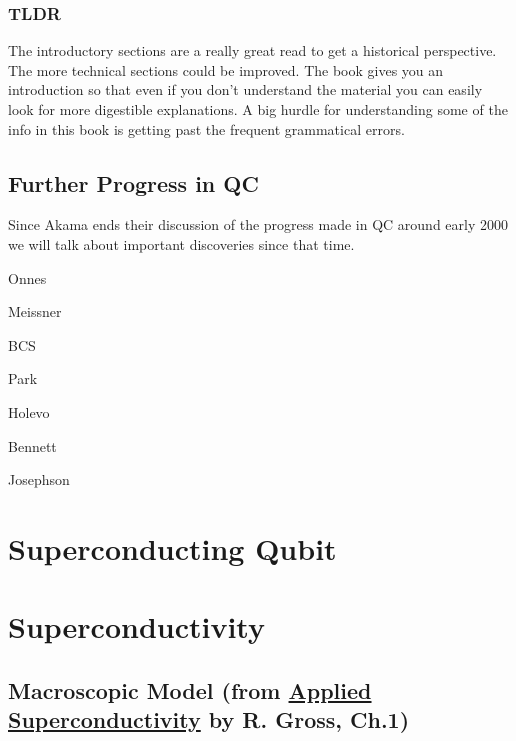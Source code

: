 \documentclass[conf]{new-aiaa}
\begin{document}
\subsubsection{TLDR}

The introductory sections are a really great read to get a historical perspective. The more technical sections could be improved. The book gives you an introduction so that even if you don't understand the material you can easily look for more digestible explanations. A big hurdle for understanding some of the info in this book is getting past the frequent grammatical errors.

\subsection{Further Progress in QC}
Since Akama ends their discussion of the progress made in QC around early 2000 we will talk about important discoveries since that time.

Onnes

Meissner

BCS

Park

Holevo

Bennett

Josephson




\pagebreak
\section{Superconducting Qubit}
\pagebreak

\section{Superconductivity}
\subsection{Macroscopic Model (from \underline{Applied Superconductivity} by R. Gross, Ch.1)}
\end{document}
